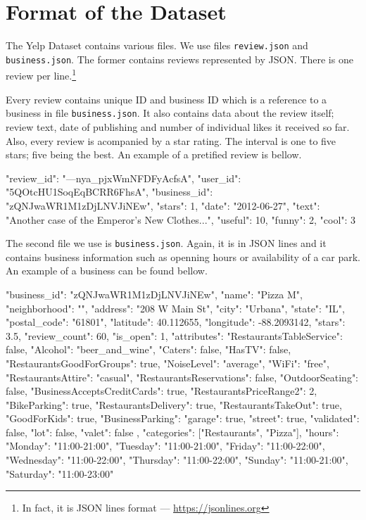 \section{Format of the Dataset}
\label{sec:format}

The Yelp Dataset contains various files.
We use files \texttt{review.json} and \texttt{business.json}.
The former contains reviews represented by JSON.
There is one review per line.\footnote{In fact, it is JSON lines format --- \url{https://jsonlines.org}}

Every review contains unique ID and business ID which is a reference to a business in file \texttt{business.json}.
It also contains data about the review itself; review text, date of publishing and number of individual likes it received so far.
Also, every review is acompanied by a star rating.
The interval is one to five stars; five being the best.
An example of a pretified review is bellow.

\begin{code}
{
	"review_id": "---nya_pjxWmNFDFyAcfsA",
	"user_id": "5QOtcHU1SoqEqBCRR6FhsA",
	"business_id": "zQNJwaWR1M1zDjLNVJiNEw",
	"stars": 1,
	"date": "2012-06-27",
	"text": "Another case of the Emperor's New Clothes...",
	"useful": 10,
	"funny": 2,
	"cool": 3
}
\end{code}

The second file we use is \texttt{business.json}.
Again, it is in JSON lines and it contains business information such as openning hours or availability of a car park.
An example of a business can be found bellow.

\begin{code}
{
	"business_id": "zQNJwaWR1M1zDjLNVJiNEw",
	"name": "Pizza M",
	"neighborhood": "",
	"address": "208 W Main St",
	"city": "Urbana",
	"state": "IL",
	"postal_code": "61801",
	"latitude": 40.112655,
	"longitude": -88.2093142,
	"stars": 3.5,
	"review_count": 60,
	"is_open": 1,
	"attributes": {
		"RestaurantsTableService": false,
		"Alcohol": "beer_and_wine",
		"Caters": false,
		"HasTV": false,
		"RestaurantsGoodForGroups": true,
		"NoiseLevel": "average",
		"WiFi": "free",
		"RestaurantsAttire": "casual",
		"RestaurantsReservations": false,
		"OutdoorSeating": false,
		"BusinessAcceptsCreditCards": true,
		"RestaurantsPriceRange2": 2,
		"BikeParking": true,
		"RestaurantsDelivery": true,
		"RestaurantsTakeOut": true,
		"GoodForKids": true,
		"BusinessParking": {
			"garage": true,
			"street": true,
			"validated": false,
			"lot": false,
			"valet": false
		}
	},
	"categories": ["Restaurants", "Pizza"],
	"hours": {
		"Monday": "11:00-21:00",
		"Tuesday": "11:00-21:00",
		"Friday": "11:00-22:00",
		"Wednesday": "11:00-22:00",
		"Thursday": "11:00-22:00",
		"Sunday": "11:00-21:00",
		"Saturday": "11:00-23:00"
	}
}
\end{code}

